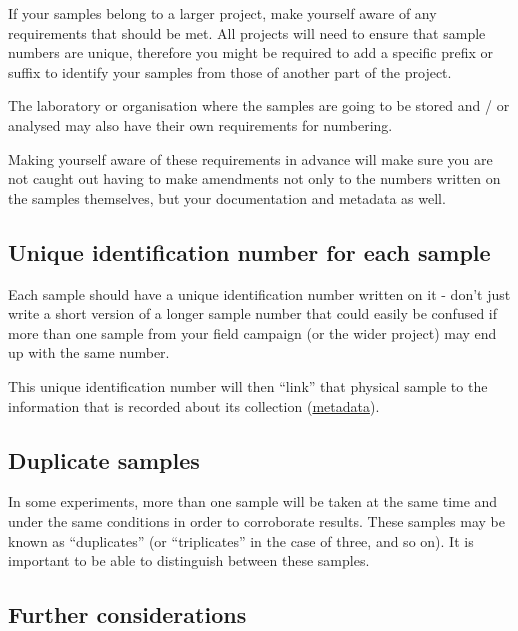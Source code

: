 \documentclass[12pt,a4paper,oneside]{report}
\begin{document}
If your samples belong to a larger project, make yourself aware of any
requirements that should be met. All projects will need to ensure that
sample numbers are unique, therefore you might be required to add a
specific prefix or suffix to identify your samples from those of another
part of the project.

The laboratory or organisation where the samples are going to be stored
and / or analysed may also have their own requirements for numbering.

Making yourself aware of these requirements in advance will make sure
you are not caught out having to make amendments not only to the numbers
written on the samples themselves, but your documentation and metadata
as well.

\hypertarget{unique-identification-number-for-each-sample}{%
\subsection{Unique identification number for each
sample}\label{unique-identification-number-for-each-sample}}

Each sample should have a unique identification number written on it -
don't just write a short version of a longer sample number that could
easily be confused if more than one sample from your field campaign (or
the wider project) may end up with the same number.

This unique identification number will then ``link'' that physical
sample to the information that is recorded about its collection
(\protect\hyperlink{recording-information-about-sample-collection-metadata}{metadata}).

\hypertarget{duplicate-samples}{%
\subsection{Duplicate samples}\label{duplicate-samples}}

In some experiments, more than one sample will be taken at the same time
and under the same conditions in order to corroborate results. These
samples may be known as ``duplicates'' (or ``triplicates'' in the case
of three, and so on). It is important to be able to distinguish between
these samples.

\hypertarget{further-considerations}{%
\subsection{Further considerations}\label{further-considerations}}
\end{document}
